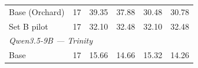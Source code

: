 \begin{table}[t]
{\begin{tabular}{lrrrrr}
Base (Orchard) & 17 & 39.35 & 37.88 & 30.48 & 30.78 \\
Set B pilot & 17 & 32.10 & 32.48 & 32.10 & 32.48 \\
\midrule
\multicolumn{6}{l}{\textit{Qwen3.5-9B --- Trinity}} \\
Base & 17 & 15.66 & 14.66 & 15.32 & 14.26 \\

\end{tabular}}
\end{table}
